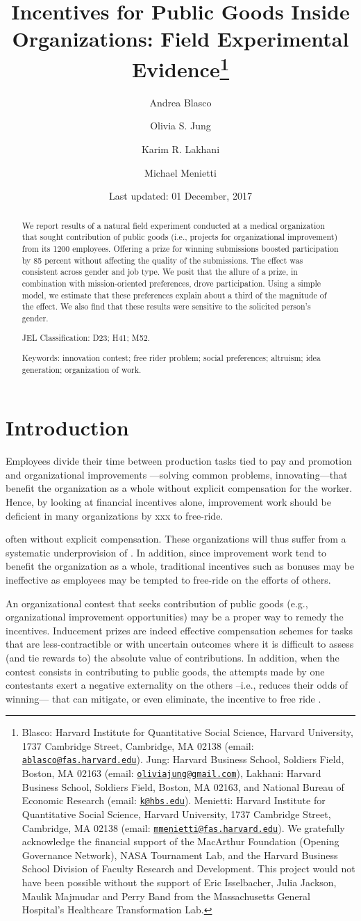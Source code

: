 \documentclass[11pt, titlepage]{article}
\title{Incentives for Public Goods Inside Organizations: Field Experimental
Evidence\thanks{Blasco: Harvard Institute for Quantitative Social Science, Harvard
University, 1737 Cambridge Street, Cambridge, MA 02138 (email:
\href{mailto:ablasco@fas.harvard.edu}{\nolinkurl{ablasco@fas.harvard.edu}}).
Jung: Harvard Business School, Soldiers Field, Boston, MA 02163 (email:
\href{mailto:oliviajung@gmail.com}{\nolinkurl{oliviajung@gmail.com}}),
Lakhani: Harvard Business School, Soldiers Field, Boston, MA 02163, and
National Bureau of Economic Research (email:
\href{mailto:k@hbs.edu}{\nolinkurl{k@hbs.edu}}). Menietti: Harvard
Institute for Quantitative Social Science, Harvard University, 1737
Cambridge Street, Cambridge, MA 02138 (email:
\href{mailto:mmenietti@fas.harvard.edu}{\nolinkurl{mmenietti@fas.harvard.edu}}).
We gratefully acknowledge the financial support of the MacArthur
Foundation (Opening Governance Network), NASA Tournament Lab, and the
Harvard Business School Division of Faculty Research and Development.
This project would not have been possible without the support of Eric
Isselbacher, Julia Jackson, Maulik Majmudar and Perry Band from the
Massachusetts General Hospital's Healthcare Transformation Lab.}}
\author{Andrea Blasco \and Olivia S. Jung \and Karim R. Lakhani \and Michael Menietti}
\date{Last updated: 01 December, 2017}
\begin{document}
\maketitle
\begin{abstract}
We report results of a natural field experiment conducted at a medical
organization that sought contribution of public goods (i.e., projects
for organizational improvement) from its 1200 employees. Offering a
prize for winning submissions boosted participation by 85 percent
without affecting the quality of the submissions. The effect was
consistent across gender and job type. We posit that the allure of a
prize, in combination with mission-oriented preferences, drove
participation. Using a simple model, we estimate that these preferences
explain about a third of the magnitude of the effect. We also find that
these results were sensitive to the solicited person's gender.

\smallskip\noindent 
JEL Classification: D23; H41; M52.

\smallskip\noindent 
Keywords: innovation contest; free rider problem; social preferences; altruism; idea generation; organization of work.
\end{abstract}


\clearpage
\tableofcontents
\setcounter{tocdepth}{2}
\clearpage

\section{Introduction}\label{introduction}

Employees divide their time between production tasks tied to pay and
promotion and organizational improvements ---solving common problems,
innovating---that benefit the organization as a whole without explicit
compensation for the worker. Hence, by looking at financial incentives
alone, improvement work should be deficient in many organizations by xxx
to free-ride.

often without explicit compensation. These organizations will thus
suffer from a systematic underprovision of . In addition, since
improvement work tend to benefit the organization as a whole,
traditional incentives such as bonuses may be ineffective as employees
may be tempted to free-ride on the efforts of others.

An organizational contest that seeks contribution of public goods (e.g.,
organizational improvement opportunities) may be a proper way to remedy
the incentives. Inducement prizes are indeed effective compensation
schemes for tasks that are less-contractible or with uncertain outcomes
\citep[ among
others]{lazear1981rank, green1983comparison, mary1984economic} where it
is difficult to assess (and tie rewards to) the absolute value of
contributions. In addition, when the contest consists in contributing to
public goods, the attempts made by one contestants exert a negative
externality on the others --i.e., reduces their odds of winning--- that
can mitigate, or even eliminate, the incentive to free ride
\citep{morgan2000financing}.
\end{document}
